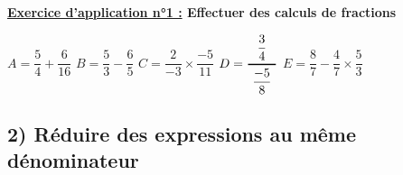 \documentclass[12pt]{article}
\begin{document}
\begin{mdframed}[
    linewidth=1pt,
    linecolor=RoyalBlue,
    innertopmargin=10pt,
    innerbottommargin=10pt
]
{\color{RoyalBlue}\textbf{\underline{Exercice d'application n°1 :} Effectuer des 
calculs de fractions}}

\begin{center}
    $A = \dfrac{5}{4}+\dfrac{6}{16}$
    \hspace{1cm}$B = \dfrac{5}{3}-\dfrac{6}{5}$
    \hspace{1cm}$C = \dfrac{2}{-3}\times\dfrac{-5}{11}$
    \hspace{1cm}$D = \genfrac{}{}{1pt}{0}{\phantom{\dfrac{1}{1}}\dfrac{3}{4}\phantom{\dfrac{1}{1}}}{\dfrac{-5}{8}}$
    \hspace{1cm}$E = \dfrac{8}{7}-\dfrac{4}{7} \times \dfrac{5}{3}$
\end{center}

\vspace{0.5cm}
\dotfill

\vspace{0.5cm}
\dotfill

\vspace{0.5cm}
\dotfill

\vspace{0.5cm}
\dotfill

\vspace{0.5cm}
\dotfill

\vspace{0.5cm}
\dotfill

\vspace{0.5cm}
\dotfill

\vspace{0.5cm}
\dotfill

\vspace{0.5cm}
\dotfill

\vspace{0.5cm}
\dotfill

\vspace{0.5cm}
\dotfill

\vspace{0.5cm}
\dotfill

\end{mdframed}

\vspace{10pt}

\subsection*{\hspace{1cm} 2) Réduire des expressions au même dénominateur}
\end{document}
